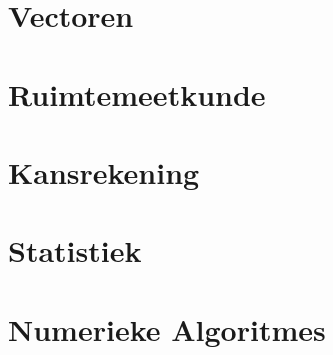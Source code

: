 \documentclass[pdftex,fleqn,a4paper]{article}
\begin{document}
 \section{Vectoren}
 \label{sec:Vectoren}
   

 \section{Ruimtemeetkunde}
 \label{sec:Ruimtemeetkunde}
   

\newpage
\section{Kansrekening}
\label{sec:Kansrekening}


 

 \newpage
 \section{Statistiek}
 \label{sec:Statistiek}
 

 \newpage

\section{Numerieke Algoritmes}
\label{sec:Numalg}
 




 \ttfamily
\end{document}
